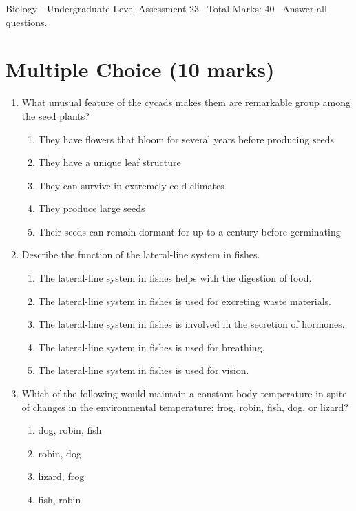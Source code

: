 \documentclass[12pt]{article}
\begin{document}
\begin{center}
Biology - Undergraduate Level Assessment 23 \
Total Marks: 40 \
Answer all questions.
\end{center}

\section*{Multiple Choice (10 marks)}
\begin{enumerate}[label=\arabic*.]
\item What unusual feature of the cycads makes them are remarkable group among the seed plants?
\begin{enumerate}[label=(\alph*)]
    \item They have flowers that bloom for several years before producing seeds
    \item They have a unique leaf structure
    \item They can survive in extremely cold climates
    \item They produce large seeds
    \item Their seeds can remain dormant for up to a century before germinating
\end{enumerate}
\item Describe the function of the lateral-line system in fishes.
\begin{enumerate}[label=(\alph*)]
    \item The lateral-line system in fishes helps with the digestion of food.
    \item The lateral-line system in fishes is used for excreting waste materials.
    \item The lateral-line system in fishes is involved in the secretion of hormones.
    \item The lateral-line system in fishes is used for breathing.
    \item The lateral-line system in fishes is used for vision.
\end{enumerate}
\item Which of the following would maintain a constant body temperature in spite of changes in the environmental temperature: frog, robin, fish, dog, or lizard?
\begin{enumerate}[label=(\alph*)]
    \item dog, robin, fish
    \item robin, dog
    \item lizard, frog
    \item fish, robin

\end{enumerate}
\end{enumerate}
\end{document}
